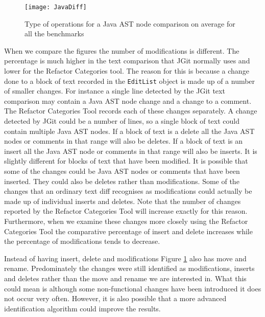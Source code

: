 \begin{figure}[p] 
 \begin{center}
 \texttt{[image: JavaDiff]}
 \end{center}
 \caption{Type of operations for a Java AST node comparison on average for all the benchmarks}
 \label{fig:javaDifference}
\end{figure}

When we compare the figures the number of modifications is different.
The percentage is much higher in the text comparison that JGit normally uses and lower for the Refactor Categories tool.
The reason for this is because a change done to a block of text recorded in the \lstinline{EditList} object is made up of a number of smaller changes.  
For instance a single line detected by the JGit text comparison may contain a Java AST node change and a change to a comment.
The Refactor Categories Tool records each of these changes separately.
A change detected by JGit could be a number of lines, so a single block of text could contain multiple Java AST nodes.  
If a block of text is a delete all the Java AST nodes or comments in that range will also be deletes. 
If a block of text is an insert all the Java AST node or comments in that range will also be inserts.
It is slightly different for blocks of text that have been modified.
It is possible that some of the changes could be Java AST nodes or comments that have been inserted.
They could also be deletes rather than modifications.
Some of the changes that an ordinary text diff recognises as modifications could actually be made up of individual inserts and deletes.
Note that the number of changes reported by the Refactor Categories Tool will increase exactly for this reason.
Furthermore, when we examine these changes more closely using the Refactor Categories Tool the comparative percentage of insert and delete increases while the percentage of modifications tends to decrease.  

Instead of having insert, delete and modifications Figure \ref{fig:javaDifference} also has move and rename.
Predominately the changes were still identified as modifications, inserts and deletes rather than the move and rename we are interested in.
What this could mean is although some non-functional changes have been introduced it does not occur very often.  
However, it is also possible that a more advanced identification algorithm could improve the results. 

